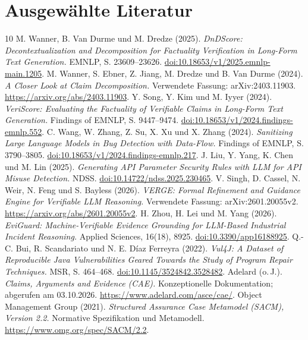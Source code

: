 \documentclass[10pt,a4paper]{article}
\begin{document}
\section*{Ausgewählte Literatur}
\begingroup
\small
\renewcommand{\section}[2]{}
\begin{thebibliography}{10}
\setlength{\itemsep}{5pt}
 M. Wanner, B. Van Durme und M. Dredze (2025).
\textit{DnDScore: Decontextualization and Decomposition for Factuality Verification in Long-Form Text Generation.}
EMNLP, S. 23609--23626. \href{https://doi.org/10.18653/v1/2025.emnlp-main.1205}{doi:10.18653/v1/2025.emnlp-main.1205}.
 M. Wanner, S. Ebner, Z. Jiang, M. Dredze und B. Van Durme (2024).
\textit{A Closer Look at Claim Decomposition.} Verwendete Fassung: arXiv:2403.11903.
\url{https://arxiv.org/abs/2403.11903}.
 Y. Song, Y. Kim und M. Iyyer (2024).
\textit{VeriScore: Evaluating the Factuality of Verifiable Claims in Long-Form Text Generation.}
Findings of EMNLP, S. 9447--9474. \href{https://doi.org/10.18653/v1/2024.findings-emnlp.552}{doi:10.18653/v1/2024.findings-emnlp.552}.
 C. Wang, W. Zhang, Z. Su, X. Xu und X. Zhang (2024).
\textit{Sanitizing Large Language Models in Bug Detection with Data-Flow.}
Findings of EMNLP, S. 3790--3805. \href{https://doi.org/10.18653/v1/2024.findings-emnlp.217}{doi:10.18653/v1/2024.findings-emnlp.217}.
 J. Liu, Y. Yang, K. Chen und M. Lin (2025).
\textit{Generating API Parameter Security Rules with LLM for API Misuse Detection.}
NDSS. \href{https://doi.org/10.14722/ndss.2025.230465}{doi:10.14722/ndss.2025.230465}.
 V. Singh, D. Cassel, N. Weir, N. Feng und S. Bayless (2026).
\textit{VERGE: Formal Refinement and Guidance Engine for Verifiable LLM Reasoning.}
Verwendete Fassung: arXiv:2601.20055v2. \url{https://arxiv.org/abs/2601.20055v2}.
 H. Zhou, H. Lei und M. Yang (2026).
\textit{EviGuard: Machine-Verifiable Evidence Grounding for LLM-Based Industrial Incident Reasoning.}
Applied Sciences, 16(18), 8925. \href{https://doi.org/10.3390/app16188925}{doi:10.3390/app16188925}.
 Q.-C. Bui, R. Scandariato und N. E. Díaz Ferreyra (2022).
\textit{Vul4J: A Dataset of Reproducible Java Vulnerabilities Geared Towards the Study of Program Repair Techniques.}
MSR, S. 464--468. \href{https://doi.org/10.1145/3524842.3528482}{doi:10.1145/3524842.3528482}.
 Adelard (o.\,J.). \textit{Claims, Arguments and Evidence (CAE).}
Konzeptionelle Dokumentation; abgerufen am 03.10.2026. \url{https://www.adelard.com/asce/cae/}.
 Object Management Group (2021).
\textit{Structured Assurance Case Metamodel (SACM), Version 2.2.}
Normative Spezifikation und Metamodell. \url{https://www.omg.org/spec/SACM/2.2}.
\end{thebibliography}
\endgroup
\end{document}
